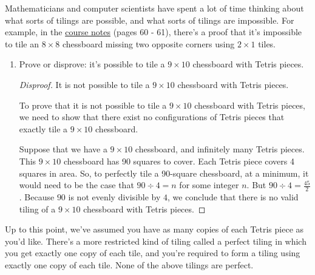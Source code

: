 \documentclass{article}
\renewcommand{\(}{\left(}
\renewcommand{\)}{\right)}
\theoremstyle{plain}
\theoremstyle{plain}
\theoremstyle{definition}
\begin{document}
Mathematicians and computer scientists have spent a lot of time thinking about what sorts of tilings are possible, and what sorts of tilings are impossible. For example, in the \href{http://web.stanford.edu/class/cs103//handouts/Mathematical\%20Foundations\%20of\%20Computing.pdf#page=60}{course notes} (pages 60 - 61), there's a proof that it's impossible to tile an $8 \times 8$ chessboard missing two opposite corners using $2 \times 1$ tiles.

\begin{enumerate}[label*=\roman*.,ref=\roman*]

\item Prove or disprove: it's possible to tile a $9 \times 10$ chessboard with Tetris pieces.

\begin{shaded}


\begin{proof}[Disproof]
	It is not possible to tile a $9 \times 10$ chessboard with Tetris pieces.
	
	To prove that it is not possible to tile a $9 \times 10$ chessboard with Tetris pieces, we need to show that there exist no configurations of Tetris pieces that exactly tile a $9 \times 10$ chessboard.
	
	Suppose that we have a $9 \times 10$ chessboard, and infinitely many Tetris pieces. This $9 \times 10$ chessboard has 90 squares to cover. Each Tetris piece covers 4 squares in area. So, to perfectly tile a 90-square chessboard, at a minimum, it would need to be the case that $90 \div 4 = n$ for some integer $n$. But $90 \div 4 = \frac{45}{2}$. Because $90$ is not evenly divisible by $4$, we conclude that there is no valid tiling of a $9 \times 10$ chessboard with Tetris pieces.
	
\end{proof}

\end{shaded}

\end{enumerate}

Up to this point, we've assumed you have as many copies of each Tetris piece as you'd like. There's a more restricted kind of tiling called a perfect tiling in which you get exactly one copy of each tile, and you're required to form a tiling using exactly one copy of each tile. None of the above tilings are perfect.
\end{document}
